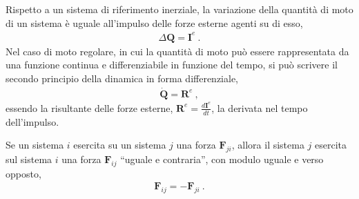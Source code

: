 \documentclass[letterpaper,10pt,english]{jupyterBook}
\begin{document}
\sphinxAtStartPar
{} Rispetto a un sistema di riferimento inerziale, la variazione della quantità di moto di un sistema è uguale all’impulso delle forze esterne agenti su di esso,
\begin{equation*}
\begin{split}\Delta \mathbf{Q} = \mathbf{I}^e \ .\end{split}
\end{equation*}
\sphinxAtStartPar
Nel caso di moto regolare, in cui la quantità di moto può essere rappresentata da una funzione continua e differenziabile in funzione del tempo, si può scrivere il secondo principio della dinamica in forma differenziale,
\begin{equation*}
\begin{split}\dot{\mathbf{Q}} = \mathbf{R}^e \ ,\end{split}
\end{equation*}
\sphinxAtStartPar
essendo la risultante delle forze esterne, \(\mathbf{R}^e = \frac{d \mathbf{I}^e}{dt}\), la derivata nel tempo dell’impulso.

\sphinxAtStartPar
{} Se un sistema \(i\) esercita su un sistema \(j\) una forza \(\mathbf{F}_{ji}\), allora il sistema \(j\) esercita sul sistema \(i\) una forza \(\mathbf{F}_{ij}\) “uguale e contraria”, con modulo uguale e verso opposto,
\begin{equation*}
\begin{split}\mathbf{F}_{ij} = - \mathbf{F}_{ji} \ .\end{split}
\end{equation*}
\sphinxstepscope
\end{document}
